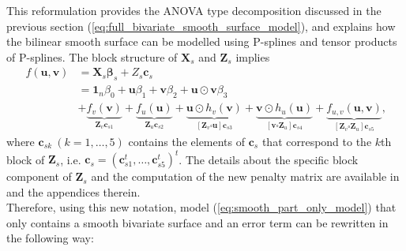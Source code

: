 This reformulation provides the ANOVA type decomposition discussed in the previous section 
(\ref{eq:full_bivariate_smooth_surface_model}), and explains how the bilinear smooth surface can be modelled using P-splines and 
tensor products of P-splines.
The block structure of $\mathbf{X}_s$ and $\mathbf{Z}_s$ implies
\begin{equation}
    \begin{aligned} 
        f(\boldsymbol{u}, \boldsymbol{v}) & =\boldsymbol{X}_{s} \boldsymbol{\beta}_{s}+Z_{s} \boldsymbol{c}_{s} \\ 
        								  & =\mathbf{1}_{n} \beta_{0}+\boldsymbol{u} \beta_{1}+\boldsymbol{v} \beta_{2}+
        								  \boldsymbol{u} \odot \boldsymbol{v} \beta_{3} \\
        								  & + \underbrace{f_{v}(\boldsymbol{v})}_{\boldsymbol{Z}_{v} \boldsymbol{c}_{s 1}}+
        								  \underbrace{f_{u}(\boldsymbol{u})}_{\boldsymbol{Z}_{u} \boldsymbol{c}_{s 2}} +
        								  \underbrace{\boldsymbol{u} \odot h_{v}(\boldsymbol{v})}_{\left[\boldsymbol{Z}_{v} 
        								  \square \boldsymbol{u}\right] \boldsymbol{c}_{s 3}}+\underbrace{\boldsymbol{v} \odot 
        								  h_{u}(\boldsymbol{u})}_{\left[\boldsymbol{v} \square \boldsymbol{Z}_{u}\right] 
        								  \boldsymbol{c}_{s 4}} +\underbrace{f_{u, v}(\boldsymbol{u}, \boldsymbol{v})}
        								  _{\left[\boldsymbol{Z}_{v} \square \boldsymbol{Z}_{u}\right] \boldsymbol{c}_{s 5}}
        								  \text{,}
    \end{aligned}
\end{equation}
where $\boldsymbol{c}_{sk} \ (k = 1,\ldots,5)$ contains the elements of $\boldsymbol{c}_s$ that correspond to the $k$th block of $\boldsymbol{Z}_s$, i.e. $\boldsymbol{c}_s = (\boldsymbol{c}_{s1}^t,\ldots,\boldsymbol{c}_{s5}^t)^t$. The details about the specific block component of $\boldsymbol{Z}_s$ and the computation of the new penalty matrix are available in  \textcite{rodriguez-alvarez_correcting_2018} and the appendices therein.\\

Therefore, using this new notation, model (\ref{eq:smooth_part_only_model}) that only contains a smooth bivariate surface and an error term can be rewritten in the following way:

